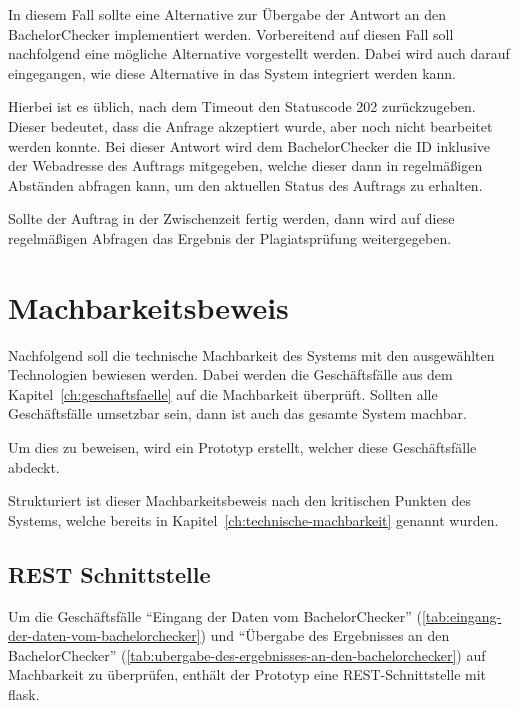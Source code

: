 In diesem Fall sollte eine Alternative zur Übergabe der Antwort an den BachelorChecker implementiert werden.
Vorbereitend auf diesen Fall soll nachfolgend eine mögliche Alternative vorgestellt werden.
Dabei wird auch darauf eingegangen, wie diese Alternative in das System integriert werden kann.

Hierbei ist es üblich, nach dem Timeout den Statuscode 202 zurückzugeben.
Dieser bedeutet, dass die Anfrage akzeptiert wurde, aber noch nicht bearbeitet werden konnte\autocite{mozilla}.
Bei dieser Antwort wird dem BachelorChecker die ID inklusive der Webadresse des Auftrags mitgegeben,
welche dieser dann in regelmäßigen Abständen abfragen kann, um den aktuellen Status des Auftrags zu erhalten.

Sollte der Auftrag in der Zwischenzeit fertig werden, dann wird auf diese regelmäßigen Abfragen das Ergebnis
der Plagiatsprüfung weitergegeben.



\section{Machbarkeitsbeweis}\label{sec:machbarkeitsbeweis}

Nachfolgend soll die technische Machbarkeit des Systems mit den ausgewählten Technologien bewiesen werden.
Dabei werden die Geschäftsfälle aus dem Kapitel~\ref{ch:geschaftsfaelle} auf die Machbarkeit überprüft.
Sollten alle Geschäftsfälle umsetzbar sein, dann ist auch das gesamte System machbar.

Um dies zu beweisen, wird ein Prototyp erstellt, welcher diese Geschäftsfälle abdeckt.

Strukturiert ist dieser Machbarkeitsbeweis nach den kritischen Punkten des Systems,
welche bereits in Kapitel~\ref{ch:technische-machbarkeit} genannt wurden.

\subsection{REST Schnittstelle}\label{subsec:rest-schnittstelle}
Um die Geschäftsfälle ``Eingang der Daten vom BachelorChecker'' (\ref{tab:eingang-der-daten-vom-bachelorchecker})
und ``Übergabe des Ergebnisses an den BachelorChecker'' (\ref{tab:ubergabe-des-ergebnisses-an-den-bachelorchecker})
auf Machbarkeit zu überprüfen, enthält der Prototyp eine REST-Schnittstelle mit flask.

